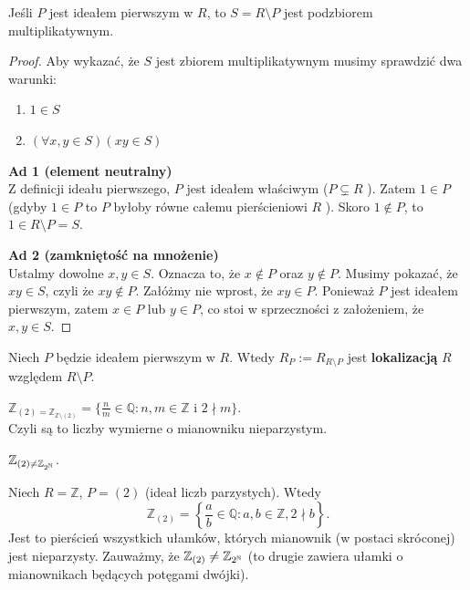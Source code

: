 \begin{fact}
Jeśli $P$ jest ideałem pierwszym w $R$, to $S = R \setminus P$ jest podzbiorem multiplikatywnym.
\end{fact}
\begin{proof}
	Aby wykazać, że $S$ jest zbiorem multiplikatywnym musimy sprawdzić dwa warunki:
	\begin{enumerate}[label=\arabic*)]
		\item $1\in S$
		\item $\left(\forall x,y \in S \right)\left( xy \in S \right)  $
	\end{enumerate}

\noindent \textbf{Ad 1 (element neutralny)} \\
Z definicji ideału pierwszego, $P$ jest ideałem właściwym ($P\subsetneq R$ ). Zatem $1 \in P$ (gdyby $1 \in P$ to $P$ byłoby równe całemu pierścieniowi $R$ ). Skoro $1 \not\in P$, to $1 \in R\setminus P= S$.

\noindent \textbf{Ad 2 (zamkniętość na mnożenie)} \\
Ustalmy dowolne $x, y \in S$. Oznacza to, że $x \not\in P$ oraz $y \not\in P$. Musimy pokazać, że $xy \in S$, czyli że $xy \not\in P$. Załóżmy nie wprost, że $xy \in P$. Ponieważ $P$ jest ideałem pierwszym, zatem  $x\in P$ lub $y \in P$, co stoi w sprzeczności z założeniem, że $x,y \in S$.
\end{proof} 
\begin{definition}
Niech $P$ będzie ideałem pierwszym w $R$. Wtedy $R_{P} := R_{R\setminus P}$ jest \textbf{lokalizacją} $R$ względem $R\setminus P$.
\end{definition}
\begin{eg}
	$\mathbb{Z}_{\left( 2 \right) = \mathbb{Z}_{\mathbb{Z}\setminus \left( 2 \right) }} = \{\frac{n}{m}\in \mathbb{Q}: n,m \in \mathbb{Z} \text{ i } 2 \nmid m\} $.\\
	Czyli są to liczby wymierne o mianowniku nieparzystym.
\end{eg} 
\begin{remark}
	$\mathbb{Z}_{\left( 2 \right) \neq \mathbb{Z}_{2^{\mathbb{N}}}}$.
\end{remark} 
\begin{eg}
Niech $R = \mathbb{Z}$, $P = (2)$ (ideał liczb parzystych). Wtedy
\[
\mathbb{Z}_{(2)} = \left\{ \frac{a}{b} \in \mathbb{Q} : a,b \in \mathbb{Z}, 2 \nmid b \right\}.
\]
Jest to pierścień wszystkich ułamków, których mianownik (w postaci skróconej) jest nieparzysty. Zauważmy, że $\mathbb{Z}_{(2)} \neq \mathbb{Z}_{2^{\mathbb{N}}}$ (to drugie zawiera ułamki o mianownikach będących potęgami dwójki).
\end{eg}

